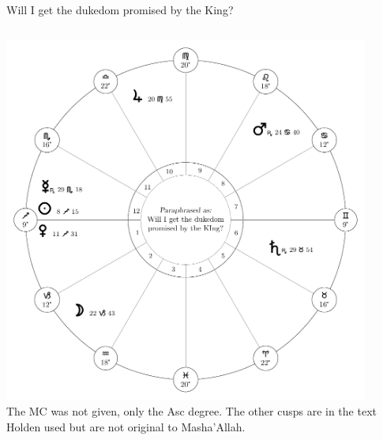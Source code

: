 \begin{frame}[t]{Will I get the dukedom promised by the King?}
\begin{columns}[T, onlytextwidth]
\begin{center}
{\includegraphics[width=0.9\textwidth]{charts/52-chart-dukedom}} \\
\scriptsize
The MC was not given, only the Asc degree. The other cusps are in the text Holden used but are not original to Masha'Allah.
\end{center}
\end{columns}

\end{frame}
